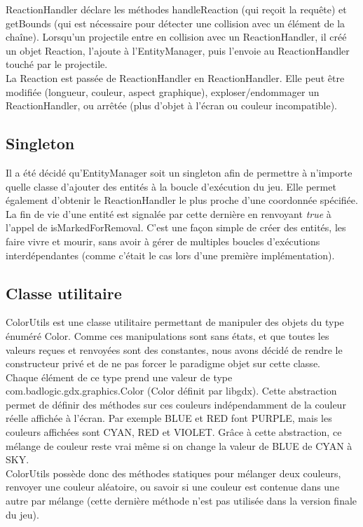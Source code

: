 \documentclass[11pt,a4paper,twoside,svgnames]{article}
\begin{document}
ReactionHandler déclare les méthodes handleReaction (qui reçoit la requête) et getBounds (qui est nécessaire pour détecter une collision avec un élément de la chaîne). Lorsqu'un projectile entre en collision avec un ReactionHandler, il créé un objet Reaction, l'ajoute à l'EntityManager, puis l'envoie au ReactionHandler touché par le projectile.\\

La Reaction est passée de ReactionHandler en ReactionHandler. Elle peut être modifiée (longueur, couleur, aspect graphique), exploser/endommager un ReactionHandler, ou arrêtée (plus d'objet à l'écran ou couleur incompatible).

\subsection{Singleton}
Il a été décidé qu'EntityManager soit un singleton afin de permettre à n'importe quelle classe d'ajouter des entités à la boucle d'exécution du jeu. Elle permet également d'obtenir le ReactionHandler le plus proche d'une coordonnée spécifiée. La fin de vie d'une entité est signalée par cette dernière en renvoyant \textit{true} à l'appel de isMarkedForRemoval. C'est une façon simple de créer des entités, les faire vivre et mourir, sans avoir à gérer de multiples boucles d'exécutions interdépendantes (comme c'était le cas lors d'une première implémentation).

\subsection{Classe utilitaire}
ColorUtils est une classe utilitaire permettant de manipuler des objets du type énuméré Color. Comme ces manipulations sont sans états, et que toutes les valeurs reçues et renvoyées sont des constantes, nous avons décidé de rendre le constructeur privé et de ne pas forcer le paradigme objet sur cette classe.\\

Chaque élément de ce type prend une valeur de type com.badlogic.gdx.graphics.Color (Color définit par libgdx). Cette abstraction permet de définir des méthodes sur ces couleurs indépendamment de la couleur réelle affichée à l'écran. Par exemple BLUE et RED font PURPLE, mais les couleurs affichées sont CYAN, RED et VIOLET. Grâce à cette abstraction, ce mélange de couleur reste vrai même si on change la valeur de BLUE de CYAN à SKY.\\

ColorUtils possède donc des méthodes statiques pour mélanger deux couleurs, renvoyer une couleur aléatoire, ou savoir si une couleur est contenue dans une autre par mélange (cette dernière méthode n'est pas utilisée dans la version finale du jeu).
\end{document}
